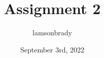 \usepackage[utf8]{inputenc}

\title{Assignment 2}
\author{lamsonbrady }
\date{September 3rd, 2022}

\usepackage{parskip}

\usepackage{fancyhdr}
\pagestyle{fancy}

\usepackage{amsmath}
\usepackage{amssymb}

\newcommand{\psmall}[1]{
\left(\begin{smallmatrix}
#1
\end{smallmatrix} \right)
}

\newcommand{\bb}{\mathbb}

